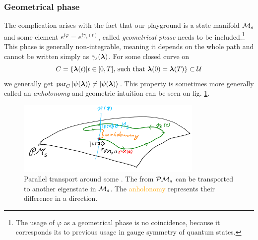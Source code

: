 \subsubsection{Geometrical phase}
The complication arises with the fact that our playground is a state manifold $\mathcal{M}_s$ and some element $e^{i\varphi}=e^{i\gamma_s(t)}$, called \emph{geometrical phase} needs to be included.\footnote{The usage of $\varphi$ as a geometrical phase is no coincidence, because it corresponds its to previous usage in gauge symmetry of quantum states.} This phase is generally non-integrable, meaning it depends on the whole path and cannot be written simply as $\gamma_s({\bm\lambda})$. For some closed curve on
\begin{equation}
    C=\{{\bm\lambda}(t)|t\in[0,T] \text{, such that }{\bm\lambda}(0)={\bm\lambda}(T)\}\subset \mathcal U
\end{equation} 
we generally get $\textrm{par}_C \ket{\psi({\bm\lambda})}\neq \ket{\psi({\bm\lambda})}$. This property is sometimes more generally called an \emph{anholonomy} %
and geometric intuition can be seen on fig. \ref{fig:parallelTransportClosed}. 
\begin{figure}[h]
    \centering
    \includegraphics[width=0.8\textwidth]{../img/parallelTransportClosedCurve_1.png}
\caption{Parallel transport around some . The  from $\mathcal{P}\mathcal{M}_s$ can be transported to another eigenstate in $\mathcal{M}_s$. The \textcolor{orange}{anholonomy} represents their difference in a  direction.}
    \label{fig:parallelTransportClosed}
\end{figure}




